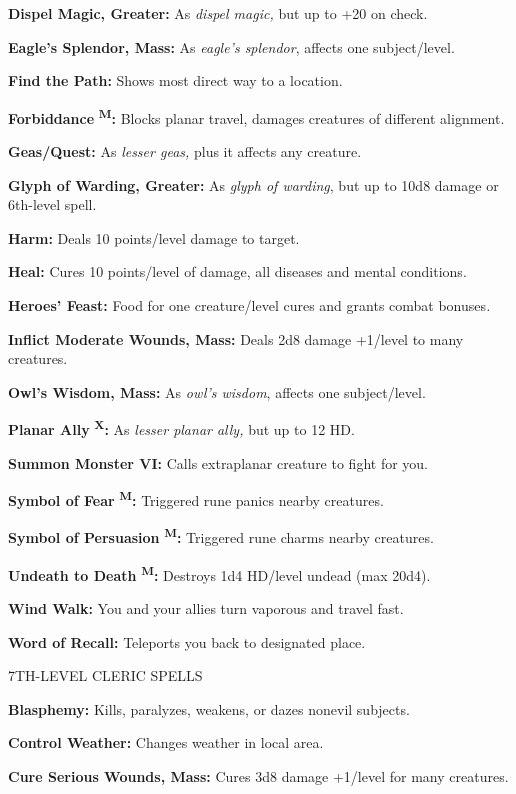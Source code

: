 \documentclass{article}
\begin{document}
\textbf{Dispel Magic, Greater:} As \textit{dispel magic, }but up to +20 on check.

\textbf{Eagle's Splendor, Mass:} As \textit{eagle's splendor}, affects one subject/level.

\textbf{Find the Path:} Shows most direct way to a location.

\textbf{Forbiddance }\textsuperscript{\textbf{M}}\textbf{:} Blocks planar travel, 
damages creatures of different alignment.

\textbf{Geas/Quest:} As \textit{lesser geas, }plus it affects any creature.

\textbf{Glyph of Warding, Greater:} As \textit{glyph of warding}, but up to 10d8 
damage or 6th-level spell.

\textbf{Harm:} Deals 10 points/level damage to target.

\textbf{Heal:} Cures 10 points/level of damage, all diseases and mental conditions.

\textbf{Heroes' Feast:} Food for one creature/level cures and grants combat bonuses\textit{.}

\textbf{Inflict Moderate Wounds, Mass:} Deals 2d8 damage +1/level to many creatures.

\textbf{Owl's Wisdom, Mass:} As \textit{owl's wisdom}, affects one subject/level.

\textbf{Planar Ally }\textsuperscript{\textbf{X}}\textbf{:} As \textit{lesser planar 
ally, }but up to 12 HD.

\textbf{Summon Monster VI:} Calls extraplanar creature to fight for you.

\textbf{Symbol of Fear }\textsuperscript{\textbf{M}}\textbf{:} Triggered rune panics 
nearby creatures.

\textbf{Symbol of Persuasion }\textsuperscript{\textbf{M}}\textbf{:} Triggered 
rune charms nearby creatures.

\textbf{Undeath to Death }\textsuperscript{\textbf{M}}\textbf{:} Destroys 1d4 HD/level 
undead (max 20d4).

\textbf{Wind Walk:} You and your allies turn vaporous and travel fast.

\textbf{Word of Recall:} Teleports you back to designated place.

7TH-LEVEL CLERIC SPELLS

\textbf{Blasphemy:} Kills, paralyzes, weakens, or dazes nonevil subjects.

\textbf{Control Weather:} Changes weather in local area.

\textbf{Cure Serious Wounds, Mass:} Cures 3d8 damage +1/level for many creatures.
\end{document}
